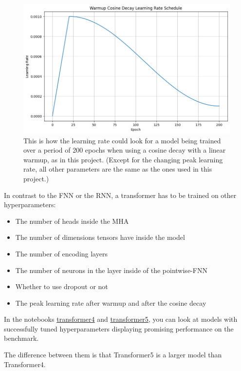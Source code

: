 \documentclass{article}
\begin{document}
\begin{figure}[htbp]
    \centering
    \includegraphics[width=0.5\paperwidth]{images/learningRate.png}
    \caption{This is how the learning rate could look for a model being trained over a period of 200 epochs when using a cosine decay with a linear warmup, as in this project. (Except for the changing peak learning rate, all other parameters are the same as the ones used in this project.)}
    \label{fig:learningrate}
\end{figure}

In contrast to the FNN or the RNN, a transformer has to be trained on other hyperparameters:
\begin{itemize}
    \item The number of heads inside the MHA
    \item The number of dimensions tensors have inside the model
    \item The number of encoding layers
    \item The number of neurons in the layer inside of the pointwise-FNN
    \item Whether to use dropout or not
    \item The peak learning rate after warmup and after the cosine decay
\end{itemize}


In the notebooks \href{https://github.com/AntonStantan/matura/blob/main/transformer/transformer4.ipynb}{transformer4} and \href{https://github.com/AntonStantan/matura/blob/main/transformer/transformer5.ipynb}{transformer5}, you can look at models with successfully tuned hyperparameters displaying promising performance on the benchmark.

The difference between them is that Transformer5 is a larger model than Transformer4.
\end{document}
